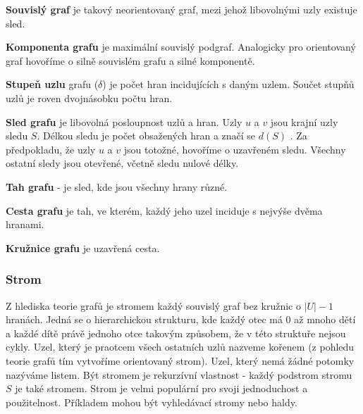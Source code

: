 \textbf{Souvislý graf} je takový neorientovaný graf, mezi jehož libovolnými uzly existuje sled. 

\textbf{Komponenta grafu }je maximální souvislý podgraf. Analogicky pro orientovaný graf hovoříme o silně souvislém grafu a silné komponentě.

\textbf{Stupeň uzlu} grafu ($\delta$) je počet hran incidujících s daným uzlem. Součet stupňů uzlů je roven dvojnásobku počtu hran.

\textbf{Sled grafu} je libovolná posloupnost uzlů a hran. Uzly $u$ a $v$ jsou krajní uzly sledu $S$. Délkou sledu je počet obsažených hran a značí se $d(S)$ . Za předpokladu, že uzly $u$ a $v$ jsou totožné, hovoříme o uzavřeném sledu. Všechny ostatní sledy jsou otevřené, včetně sledu nulové délky.

\textbf{Tah grafu} - je sled, kde jsou všechny hrany různé.

\textbf{Cesta grafu} je tah, ve kterém, každý jeho uzel inciduje s nejvýše dvěma hranami. 

\textbf{Kružnice grafu} je uzavřená cesta.

\subsubsection{Strom}
Z hlediska teorie grafů je stromem každý souvislý graf bez kružnic o $|U|-1$ hranách. Jedná se o hierarchickou strukturu, kde každý otec má 0 až mnoho dětí a každé dítě právě jednoho otce takovým způsobem, že v této struktuře nejsou cykly. Uzel, který je praotcem všech ostatních uzlů nazveme kořenem (z pohledu teorie grafů tím vytvoříme orientovaný strom). Uzel, který nemá žádné potomky nazýváme listem. Být stromem je rekurzívní vlastnost - každý podstrom stromu $S$ je také stromem. Strom je velmi populární pro svoji jednoduchost a použitelnost. Příkladem mohou být vyhledávací stromy nebo haldy.